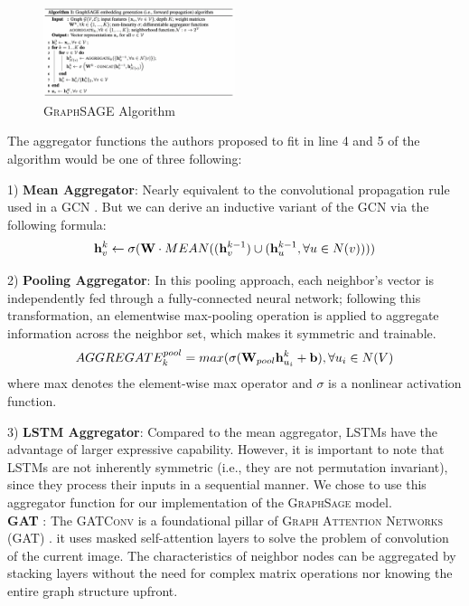 \documentclass[sigconf, nonacm]{acmart}
\begin{document}
\begin{figure}[h]
    \centering
    \includegraphics[width=0.5\textwidth]{GraphSAGE.png}
    \caption{\textsc{GraphSAGE} Algorithm \cite{Hamiltonetal.2017}}
    \label{fig:GraphSage}
\end{figure}
 
The aggregator functions the authors proposed to fit in line 4 and 5 of the algorithm would be one of three following:

1) \textbf{Mean Aggregator}: Nearly equivalent to the convolutional propagation rule used in a \textsc{GCN} \cite{Kipf&Welling2017}. But we can derive an inductive variant of the \textsc{GCN} \cite{Kipf&Welling2017} via the following formula:
\begin{align}
    \centering
    \mathbf{h}_v^k \leftarrow \sigma(\mathbf{W} \cdot MEAN( ({\mathbf{h}^{k-1}_v})  \cup  ({\mathbf{h}^{k-1}_u, \forall u \in N(v)})))
    \label{mean_agg}
\end{align} 

2) \textbf{Pooling Aggregator}: In this
pooling approach, each neighbor’s vector is independently fed through a fully-connected neural network; following this transformation, an elementwise max-pooling operation is applied to aggregate information across the neighbor set, which makes it symmetric and trainable. 
\begin{align}
    \centering
    AGGREGATE_k^{pool} =  max( { \sigma(\mathbf{W}_{pool} \mathbf{h}^k_{u_i} + \mathbf{b}), \forall u_i \in N(V)}
    \label{pool_agg}
\end{align} 
where max denotes the element-wise max operator and $\sigma$ is a nonlinear activation function. 

3) \textbf{LSTM Aggregator}:  Compared to the mean aggregator, LSTMs have the advantage of larger expressive capability. However, it is important to note that LSTMs are not inherently symmetric (i.e., they are not permutation invariant), since they process their inputs in a sequential manner. We chose to use this aggregator function for our implementation of the \textsc{GraphSage} model. \\

\textbf{GAT} : The \textsc{GATConv} is a foundational pillar of \textsc{Graph Attention Networks (GAT)} \cite{Velickovic2017}. it uses masked self-attention layers to solve the problem of convolution of the current image. The characteristics of neighbor nodes can be aggregated by stacking layers without the need for complex matrix operations nor knowing the entire graph structure upfront.
\end{document}
